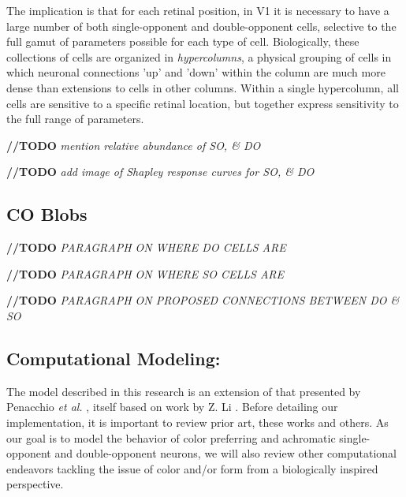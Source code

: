 \documentclass[journal,onecolumn]{IEEEtran}
\begin{document}
The implication is that for each retinal position, in V1 it is necessary to have a large number of both single-opponent and double-opponent cells, selective to the full gamut of parameters possible for each type of cell. Biologically, these collections of cells are organized in \textit{hypercolumns}, a physical grouping of cells in which neuronal connections 'up' and 'down' within the column are much more dense than extensions to cells in other columns. Within a single hypercolumn, all cells are sensitive to a specific retinal location, but together express sensitivity to the full range of parameters.

\bigskip

\textbf{//TODO} \textit{mention relative abundance of SO, \& DO}

\textbf{//TODO} \textit{add image of Shapley response curves for SO, \& DO}

\subsection*{CO Blobs}

\textbf{//TODO} \textit{PARAGRAPH ON WHERE DO CELLS ARE}

\textbf{//TODO} \textit{PARAGRAPH ON WHERE SO CELLS ARE}

\textbf{//TODO} \textit{PARAGRAPH ON PROPOSED CONNECTIONS BETWEEN DO \& SO}


\subsection{Computational Modeling:}

The model described in this research is an extension of that presented by Penacchio \textit{et al.} \cite{otazu:plosive}, itself based on work by Z. Li \cite{li:1998, li:1999}. Before detailing our implementation, it is important to review prior art, these works and others. As our goal is to model the behavior of color preferring and achromatic single-opponent and double-opponent neurons, we will also review other computational endeavors tackling the issue of color and/or form from a biologically inspired perspective.
\end{document}
